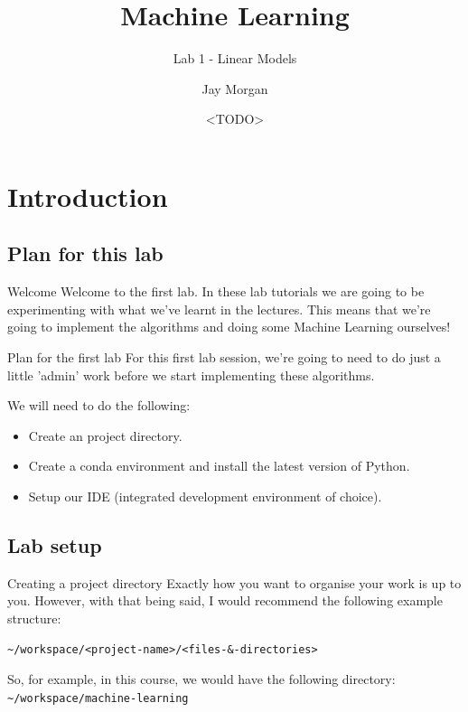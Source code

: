 \documentclass[10pt]{beamer}
\author{Jay Morgan}
\date{<TODO>}
\title{Machine Learning}
\subtitle{Lab 1 - Linear Models}
\begin{document}
\maketitle

\section*{Introduction}
\label{sec:org4096cea}

\subsection*{Plan for this lab}
\label{sec:orge2c6e2e}

\begin{frame}[label={sec:org1837398}]{Welcome}
Welcome to the first lab. In these lab tutorials we are going to be experimenting
with what we've learnt in the lectures. This means that we're going to implement the
algorithms and doing some Machine Learning ourselves!
\end{frame}

\begin{frame}[label={sec:org6418bc1}]{Plan for the first lab}
For this first lab session, we're going to need to do just a little 'admin' work
before we start implementing these algorithms.

We will need to do the following:
\begin{itemize}
\item Create an project directory.
\item Create a conda environment and install the latest version of Python.
\item Setup our IDE (integrated development environment of choice).
\end{itemize}
\end{frame}

\subsection*{Lab setup}
\label{sec:org745fb5c}

\begin{frame}[label={sec:org79d83f0},fragile]{Creating a project directory}
 Exactly how you want to organise your work is up to you. However, with that being
said, I would recommend the following example structure:

\begin{verbatim}
~/workspace/<project-name>/<files-&-directories>
\end{verbatim}

So, for example, in this course, we would have the following directory:
\texttt{\textasciitilde{}/workspace/machine-learning}
\end{frame}
\end{document}
